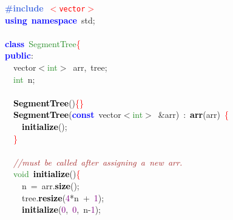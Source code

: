\noindent
\mbox{}\textbf{\textcolor{RoyalBlue}{\#include}}\ \texttt{\textcolor{Red}{$<$vector$>$}} \\
\mbox{}\textbf{\textcolor{Blue}{using}}\ \textbf{\textcolor{Blue}{namespace}}\ std\textcolor{BrickRed}{;} \\
\mbox{} \\
\mbox{}\textbf{\textcolor{Blue}{class}}\ \textcolor{ForestGreen}{SegmentTree}\textcolor{Red}{\{} \\
\mbox{}\textbf{\textcolor{Blue}{public}}\textcolor{BrickRed}{:} \\
\mbox{}\ \ vector\textcolor{BrickRed}{$<$}\textcolor{ForestGreen}{int}\textcolor{BrickRed}{$>$}\ arr\textcolor{BrickRed}{,}\ tree\textcolor{BrickRed}{;} \\
\mbox{}\ \ \textcolor{ForestGreen}{int}\ n\textcolor{BrickRed}{;} \\
\mbox{} \\
\mbox{}\ \ \textbf{\textcolor{Black}{SegmentTree}}\textcolor{BrickRed}{()}\textcolor{Red}{\{\}} \\
\mbox{}\ \ \textbf{\textcolor{Black}{SegmentTree}}\textcolor{BrickRed}{(}\textbf{\textcolor{Blue}{const}}\ vector\textcolor{BrickRed}{$<$}\textcolor{ForestGreen}{int}\textcolor{BrickRed}{$>$}\ \textcolor{BrickRed}{\&}arr\textcolor{BrickRed}{)}\ \textcolor{BrickRed}{:}\ \textbf{\textcolor{Black}{arr}}\textcolor{BrickRed}{(}arr\textcolor{BrickRed}{)}\ \textcolor{Red}{\{} \\
\mbox{}\ \ \ \ \textbf{\textcolor{Black}{initialize}}\textcolor{BrickRed}{();} \\
\mbox{}\ \ \textcolor{Red}{\}} \\
\mbox{} \\
\mbox{}\ \ \textit{\textcolor{Brown}{//must\ be\ called\ after\ assigning\ a\ new\ arr.}} \\
\mbox{}\ \ \textcolor{ForestGreen}{void}\ \textbf{\textcolor{Black}{initialize}}\textcolor{BrickRed}{()}\textcolor{Red}{\{} \\
\mbox{}\ \ \ \ n\ \textcolor{BrickRed}{=}\ arr\textcolor{BrickRed}{.}\textbf{\textcolor{Black}{size}}\textcolor{BrickRed}{();} \\
\mbox{}\ \ \ \ tree\textcolor{BrickRed}{.}\textbf{\textcolor{Black}{resize}}\textcolor{BrickRed}{(}\textcolor{Purple}{4}\textcolor{BrickRed}{*}n\ \textcolor{BrickRed}{+}\ \textcolor{Purple}{1}\textcolor{BrickRed}{);} \\
\mbox{}\ \ \ \ \textbf{\textcolor{Black}{initialize}}\textcolor{BrickRed}{(}\textcolor{Purple}{0}\textcolor{BrickRed}{,}\ \textcolor{Purple}{0}\textcolor{BrickRed}{,}\ n\textcolor{BrickRed}{-}\textcolor{Purple}{1}\textcolor{BrickRed}{);} \\
